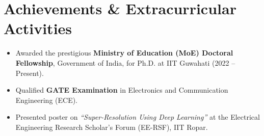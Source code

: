 \documentclass[a4paper,11pt]{article}
\newcommand{\resumeSubHeadingListStart}{\begin{itemize}[leftmargin=*,labelsep=0mm]}
\newcommand{\resumeSubHeadingListEnd}{\end{itemize}\vspace{2mm}}
\begin{document}
\section{\textbf{Achievements \& Extracurricular Activities}}
\resumeSubHeadingListStart
  \item {Awarded the prestigious \textbf{Ministry of Education (MoE) Doctoral Fellowship}, Government of India, for Ph.D. at IIT Guwahati (2022 -- Present).}
  \item {Qualified \textbf{GATE Examination} in Electronics and Communication Engineering (ECE).}
  \item {Presented poster on \textit{``Super-Resolution Using Deep Learning''} at the Electrical Engineering Research Scholar's Forum (EE-RSF), IIT Ropar.}
\resumeSubHeadingListEnd
\end{document}
